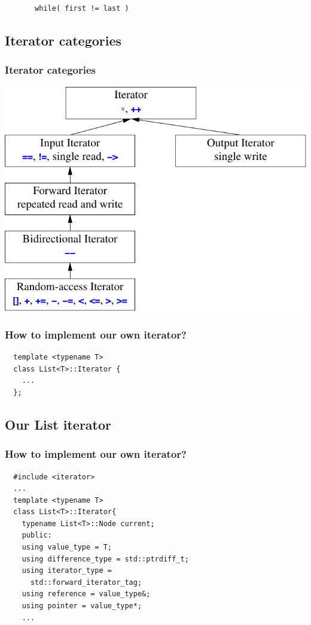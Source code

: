 \begin{frame}[fragile]
  \vfill
  \begin{lstlisting}
       while( first != last )
  \end{lstlisting}
  \vfill
\end{frame}


\subsection{Iterator categories}
\begin{frame}
  \frametitle{Iterator categories}
  \centering
  \includegraphics[height=0.8\textheight]{img/iterators.png}
\end{frame}

\begin{frame}[fragile]
  \frametitle{How to implement our own iterator?}
\begin{lstlisting}
  template <typename T>
  class List<T>::Iterator {
    ...
  };
\end{lstlisting}
\end{frame}

\subsection{Our List iterator}
\begin{frame}[fragile]
  \frametitle{How to implement our own iterator?}
\begin{lstlisting}
  #include <iterator>
  ...
  template <typename T>
  class List<T>::Iterator{
    typename List<T>::Node current;
    public:
    using value_type = T;
    using difference_type = std::ptrdiff_t;
    using iterator_type =
      std::forward_iterator_tag;
    using reference = value_type&;
    using pointer = value_type*;
    ...
\end{lstlisting}
\end{frame}

